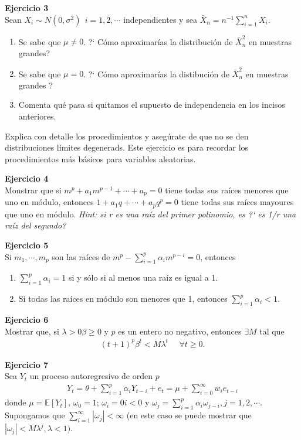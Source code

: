 \documentclass[a4paper, 11pt]{article}
\newenvironment{problem}[2][Ejercicio]
{ \begin{mdframed}[backgroundcolor= red!50] \textbf{#1 #2} \\}
	{  \end{mdframed}}
\begin{document}
\begin{problem}{3}
    Sean $X_i \sim N(0, \sigma^2) \: \: i = 1,2,\cdots$ independientes y sea $\bar{X}_n = n^{-1} \sum _{i=1}^n X_i .$
    \begin{enumerate}
        \item Se sabe que $\mu \neq 0$. ?` Cómo aproximarías la distribución de $\bar{X}_n^2 $ en muestras grandes? 
        \item Se sabe que $\mu = 0$. ?` Cómo aproximarías la distibución de $\bar{X}_n^2$ en muestras grandes ?
        \item Comenta qué pasa si quitamos el supuesto de independencia en los incisos anteriores. 
    \end{enumerate} 
    Explica con detalle los procedimientos y asegúrate de que no se den distribuciones límites degenerads. Este ejercicio es para recordar los procedimientos más básicos para variables aleatorias.
\end{problem}

\begin{problem}{4}
    Monstrar que si $m^p + a_1 m^{p-1} + \cdots + a_p = 0 $ tiene todas sus raíces menores que uno en módulo, entonces $1+ a_1 q + \cdots + a_p q^p = 0$ tiene todas sus raíces mayoures que uno en módulo. \textit{Hint: si r es una raíz del primer polinomio, es ?` es 1/r una raíz del segundo?}    
\end{problem}

\begin{problem}{5}
    Si $m_1, \cdots, m_p$ son las raíces de $ m^p - \sum _{i=1}^p \alpha_i m^{p-i} =  0$, entonces
    \begin{enumerate}
        \item $\sum _{i=1}^p \alpha_i = 1$ si y sólo si al menos una raíz es igual a 1.
        \item Si todas las raíces en módulo son menores que 1, entonces $\sum_{i=1}^p \alpha_i <1$.
    \end{enumerate}
\end{problem}


\begin{problem}{6} 
    Mostrar que, si $\lambda > 0 \beta \geq 0$ y $p$ es un entero no negativo, entonces $\exists M $ tal que 
    \begin{align*}
        (t+1)^p \beta^t < M \lambda^t \:\:\:\:\:\: \forall t \geq 0.    
    \end{align*}
\end{problem}

\begin{problem}{7} 
    Sea $Y_t$ un proceso autoregresivo de orden $p$
    \begin{align*}
        Y_t = \theta + \sum_{i = 1}^{p } \alpha_i Y_{t-i } + e_t = \mu + \sum_{i=0}^{\infty} w_i e_{t-i }
    \end{align*}
    donde $\mu = \mathbb{E}[Y_t ]$, $\omega_0 = 1$; $ \omega_i = 0  i < 0$ y $\omega_j = \sum_{i=1}^{p } \alpha_i \omega_{j-i }, j = 1,2,\cdots. $ Supongamos que $\sum_{i=1}^{\infty} |\omega_j| < \infty $ (en este caso se puede mostrar que $|\omega _j| < M \lambda^j, \lambda <1) $. 
\end{problem}
\end{document}
